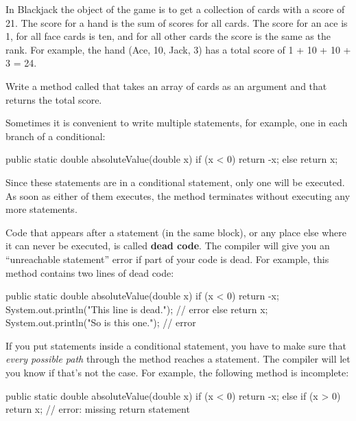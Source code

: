 \begin{exercise}

In Blackjack the object of the game is to get a collection of cards with a score of 21.
The score for a hand is the sum of scores for all cards.
The score for an ace is 1, for all face cards is ten, and for all other cards the score is the same as the rank.
For example, the hand (Ace, 10, Jack, 3) has a total score of 1 + 10 + 10 + 3 = 24.

Write a method called  that takes an array of cards as an argument and that returns the total score.

\end{exercise}


Sometimes it is convenient to write multiple  statements, for example, one in each branch of a conditional:

\begin{code}
public static double absoluteValue(double x) {
    if (x < 0) {
        return -x;
    } else {
        return x;
    }
}
\end{code}

Since these  statements are in a conditional statement, only one will be executed.
As soon as either of them executes, the method terminates without executing any more statements.


Code that appears after a  statement (in the same block), or any place else where it can never be executed, is called {\bf dead code}.
The compiler will give you an ``unreachable statement'' error if part of your code is dead.
For example, this method contains two lines of dead code:

\begin{code}
public static double absoluteValue(double x) {
    if (x < 0) {
        return -x;
        System.out.println("This line is dead.");  // error
    } else {
        return x;
    }
    System.out.println("So is this one.");  // error
}
\end{code}

If you put  statements inside a conditional statement, you have to make sure that {\em every possible path} through the method reaches a  statement.
The compiler will let you know if that's not the case.
For example, the following method is incomplete:

\begin{code}
public static double absoluteValue(double x) {
    if (x < 0) {
        return -x;
    } else if (x > 0) {
        return x;
    }
    // error: missing return statement
}
\end{code}

